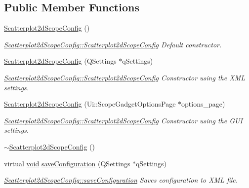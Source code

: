 \subsection*{\-Public \-Member \-Functions}
\begin{DoxyCompactItemize}
\item 
\hyperlink{group___scope_plugin_gafdcf057f46ce7c284b969bf8d0a8fe0e}{\-Scatterplot2d\-Scope\-Config} ()
\begin{DoxyCompactList}\small\item\em \hyperlink{group___scope_plugin_gafdcf057f46ce7c284b969bf8d0a8fe0e}{\-Scatterplot2d\-Scope\-Config\-::\-Scatterplot2d\-Scope\-Config} \-Default constructor. \end{DoxyCompactList}\item 
\hyperlink{group___scope_plugin_ga3f0c68575d63ef6831f8e28d5835e056}{\-Scatterplot2d\-Scope\-Config} (\-Q\-Settings $\ast$q\-Settings)
\begin{DoxyCompactList}\small\item\em \hyperlink{group___scope_plugin_gafdcf057f46ce7c284b969bf8d0a8fe0e}{\-Scatterplot2d\-Scope\-Config\-::\-Scatterplot2d\-Scope\-Config} \-Constructor using the \-X\-M\-L settings. \end{DoxyCompactList}\item 
\hyperlink{group___scope_plugin_gab4f886463a61e05057f4fc3043b08f9e}{\-Scatterplot2d\-Scope\-Config} (\-Ui\-::\-Scope\-Gadget\-Options\-Page $\ast$options\-\_\-page)
\begin{DoxyCompactList}\small\item\em \hyperlink{group___scope_plugin_gafdcf057f46ce7c284b969bf8d0a8fe0e}{\-Scatterplot2d\-Scope\-Config\-::\-Scatterplot2d\-Scope\-Config} \-Constructor using the \-G\-U\-I settings. \end{DoxyCompactList}\item 
\hyperlink{group___scope_plugin_gad761d10c520b7bbeabfd1eac13b8d6d9}{$\sim$\-Scatterplot2d\-Scope\-Config} ()
\item 
virtual \hyperlink{group___u_a_v_objects_plugin_ga444cf2ff3f0ecbe028adce838d373f5c}{void} \hyperlink{group___scope_plugin_ga37a87c7a797180e5634b24238137d996}{save\-Configuration} (\-Q\-Settings $\ast$q\-Settings)
\begin{DoxyCompactList}\small\item\em \hyperlink{group___scope_plugin_ga37a87c7a797180e5634b24238137d996}{\-Scatterplot2d\-Scope\-Config\-::save\-Configuration} \-Saves configuration to \-X\-M\-L file. \end{DoxyCompactList}\item 

\end{DoxyCompactItemize}
